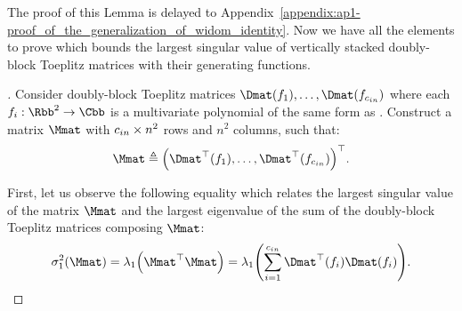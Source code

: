 \noindent
The proof of this Lemma is delayed to Appendix~\ref{appendix:ap1-proof_of_the_generalization_of_widom_identity}.
Now we have all the elements to prove  which bounds the largest singular value of vertically stacked doubly-block Toeplitz matrices with their generating functions. 

\begingroup
\addtolength{\jot}{1.5em}

\begin{proof}[]

Consider doubly-block Toeplitz matrices $\Dmat(f_1), \dots, \Dmat(f_{\cin})$ where each $f_i: \Rbb^2 \rightarrow \Cbb$ is a multivariate polynomial of the same form as .
Construct a matrix $\Mmat$ with $c_{in}\times n^2$ rows and $n^2$ columns, such that:
\begin{equation}
  \Mmat \triangleq \leftmat \Dmat^\top(f_1), \dots, \Dmat^\top(f_{\cin}) \rightmat^\top .
\end{equation}

\noindent
First, let us observe the following equality which relates the largest singular value of the matrix $\Mmat$ and the largest eigenvalue of the sum of the doubly-block Toeplitz matrices composing $\Mmat$:
\begin{equation}
    \sigma_1^2 \left( \Mmat \right) = \lambda_1 \left( \Mmat^{\top} \Mmat \right) = \lambda_1 \left( \sum_{i=1}^{\cin} \Dmat^{\top} \left(f_i \right) \Dmat (f_i) \right).
\end{equation}


\end{proof}
